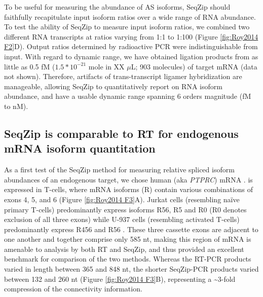 {		To be useful for measuring the abundance of AS isoforms, SeqZip should faithfully recapitulate input isoform ratios over a wide range of RNA abundance. To test the ability of SeqZip to measure input isoform ratios, we combined two different RNA transcripts at ratios varying from 1:1 to 1:100 (Figure \ref{fig:Roy2014 F2}D). Output ratios determined by radioactive PCR were indistinguishable from input. With regard to dynamic range, we have obtained ligation products from as little as 0.5 fM ($1.5 * 10^{-21}$ mole in 
		XX $\mu$L;  903 molecules) of target mRNA (data not shown). Therefore, artifacts of trans-transcript ligamer hybridization are manageable, allowing SeqZip to quantitatively report on RNA isoform abundance, and have a usable dynamic range spanning 6 orders magnitude (fM to nM).

	\subsection{SeqZip is comparable to RT for endogenous mRNA isoform quantitation}

		As a first test of the SeqZip method for measuring relative spliced isoform abundances of an endogenous target, we chose human \cd{} (aka \textit{PTPRC}) mRNA \citep{Zikherman2008}. \cd{} is expressed in T-cells, where mRNA isoforms (R) contain various combinations of exons 4, 5, and 6 (Figure \ref{fig:Roy2014 F3}A). Jurkat cells (resembling naïve primary T-cells) predominantly express isoforms R56, R5 and R0 (R0 denotes exclusion of all three exons) while U-937 cells (resembling activated T-cells) predominantly express R456 and R56 \citep{Yeakley2002}. These three cassette exons are adjacent to one another and together comprise only 585 nt, making this region of \cd{} mRNA is amenable to analysis by both RT and SeqZip, and thus provided an excellent benchmark for comparison of the two methods. Whereas the RT-PCR products varied in length between 365 and 848 nt, the shorter SeqZip-PCR products varied between 132 and 260 nt (Figure \ref{fig:Roy2014 F3}B), representing a \textasciitilde 3-fold compression of the connectivity information.

}
